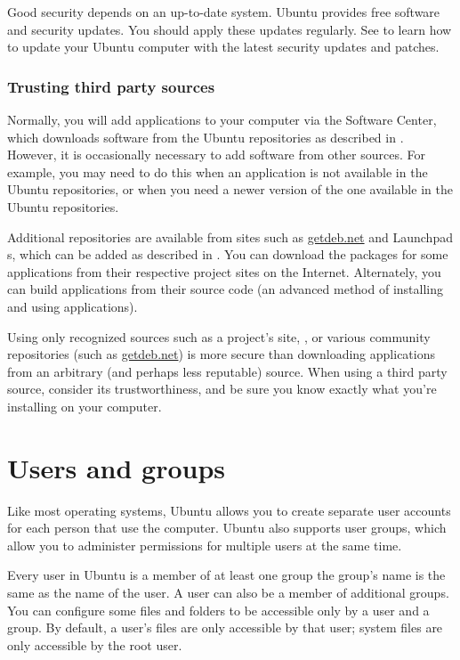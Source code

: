 Good security depends on an up-to-date system. Ubuntu provides free software and security updates. You should apply these updates regularly. See  to learn how to update your Ubuntu computer with the latest security updates and patches.

\subsubsection{Trusting third party sources}
\label{sec:security:trusting-third-party-sources}

Normally, you will add applications to your computer via the Software Center, which downloads software from the Ubuntu repositories as described in . However, it is occasionally necessary to add software from other sources. For example, you may need to do this when an application is not available in the Ubuntu repositories, or when you need a newer version of the one available in the Ubuntu repositories.

Additional repositories are available from sites such as \href{http://getdeb.net}{getdeb.net} and Launchpad s, which can be added as described in . You can download the  packages for some applications from their respective project sites on the Internet. Alternately, you can build applications from their source code (an advanced method of installing and using applications).

Using only recognized sources such as a project's site, , or various community repositories (such as \href{http://getdeb.net}{getdeb.net}) is more secure than downloading applications from an arbitrary (and perhaps less reputable) source. When using a third party source, consider its trustworthiness, and be sure you know exactly what you're installing on your computer.

\section{Users and groups}
\label{sec:security:users-and-groups}

Like most operating systems, Ubuntu allows you to create separate user accounts for each person that use the computer. Ubuntu also supports user groups, which allow you to administer permissions for multiple users at the same time. 

Every user in Ubuntu is a member of at least one group \dash the group's name is the same as the name of the user. A user can also be a member of additional groups. You can configure some files and folders to be accessible only by a user and a group. By default, a user's files are only accessible by that user; system files are only accessible by the root user.

